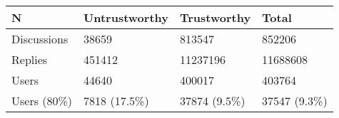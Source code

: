 \begin{tabular}{llll}
\toprule
N & Untrustworthy & Trustworthy & Total \\
\midrule
Discussions & 38659 & 813547 & 852206 \\
Replies & 451412 & 11237196 & 11688608 \\
Users & 44640 & 400017 & 403764 \\
Users (80\%) & 7818 (17.5\%) & 37874 (9.5\%) & 37547 (9.3\%) \\
\bottomrule
\end{tabular}
